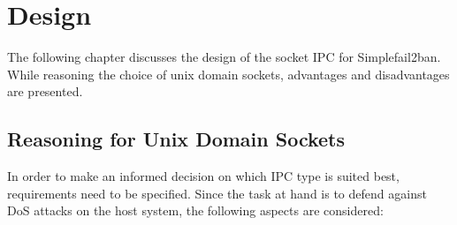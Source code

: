 %
%

\chapter{Design}
\label{cha:design}
The following chapter discusses the design of the socket \ac{IPC} for Simplefail2ban.
While reasoning the choice of unix domain sockets, advantages and disadvantages are presented.

\section{Reasoning for Unix Domain Sockets}
\label{cha:ReasoningUnixSockets}
In order to make an informed decision on which \ac{IPC} type is suited best, requirements need to be specified.
Since the task at hand is to defend against \ac{DoS} attacks on the host system, the following aspects are considered\cite{raatschen:ipc}:

